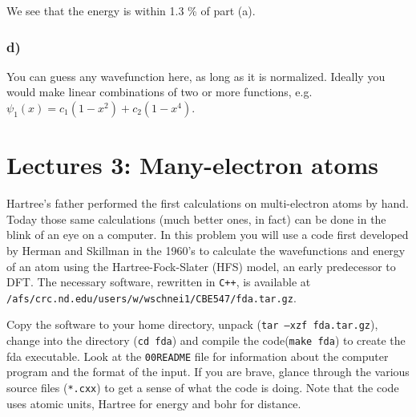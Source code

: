 \documentclass[11pt]{article}
\begin{document}
We see that the energy is within 1.3 \% of part (a).


\subsubsection{d)}
\label{sec-1-1-4}

You can guess any wavefunction here, as long as it is normalized. Ideally you would make linear combinations of two or more functions, e.g. $\psi_{1}(x) = c_{1}(1-x^{2}) + c_{2}(1-x^{4})$.


\section{Lectures 3: Many-electron atoms}
\label{sec-2}

Hartree’s father performed the first calculations on multi-electron atoms by hand. Today those same calculations (much better ones, in fact) can be done in the blink of an eye on a computer. In this problem you will use a code first developed by Herman and Skillman in the 1960’s to calculate the wavefunctions and energy of an atom using the Hartree-Fock-Slater (HFS) model, an early predecessor to DFT. The necessary software, rewritten in \texttt{C++}, is available at \verb~/afs/crc.nd.edu/users/w/wschnei1/CBE547/fda.tar.gz~.

Copy the software to your home directory, unpack (\verb~tar –xzf fda.tar.gz~), change into the directory (\verb~cd fda~) and compile the code(\verb~make fda~) to create the fda executable. Look at the \texttt{00README} file for information about the computer program and the format of the input. If you are brave, glance through the various source files (\verb~*.cxx~) to get a sense of what the code is doing. Note that the code uses atomic units, Hartree for energy and bohr for distance.
\end{document}

